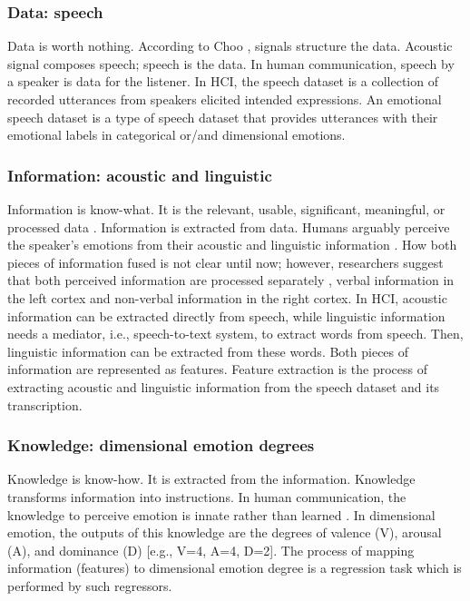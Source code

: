 \subsubsection{Data: speech}
Data is worth nothing. According to Choo \cite{Choo2007}, signals structure the
data. Acoustic signal composes speech; speech is the data. In human
communication, speech by a speaker is data for the listener. In HCI, the speech
dataset is a collection of recorded utterances from speakers elicited intended
expressions. An emotional speech dataset is a type of speech dataset that
provides utterances with their emotional labels in categorical or/and
dimensional emotions.

\subsubsection{Information: acoustic and linguistic}
Information is know-what. It is the relevant, usable, significant, meaningful,
or processed data \cite{Rowley2007}. Information is extracted from data. Humans
arguably perceive the speaker's emotions from their acoustic and linguistic
information \cite{Nygaard2008}. How both pieces of information fused is not
clear until now; however, researchers suggest that both perceived information
are processed separately \cite{Berckmoes2004, Kotz2011}, verbal information in
the left cortex and non-verbal information in the right cortex. In HCI,
acoustic information can be extracted directly from speech, while linguistic
information needs a mediator, i.e., speech-to-text system, to extract words
from speech. Then, linguistic information can be extracted from these words.
Both pieces of information are represented as features. Feature extraction is
the process of extracting acoustic and linguistic information from the speech
dataset and its transcription.

\subsubsection{Knowledge: dimensional emotion degrees}
Knowledge is know-how. It is extracted from the information. Knowledge
transforms information into instructions. In human communication, the knowledge
to perceive emotion is innate rather than learned \cite{Matsumoto2009}. In
dimensional emotion, the outputs of this knowledge are the degrees of valence
(V), arousal (A), and dominance (D) [e.g., V=4, A=4, D=2]. The process of
mapping information (features) to dimensional emotion degree is a regression
task which is performed by such regressors. 


